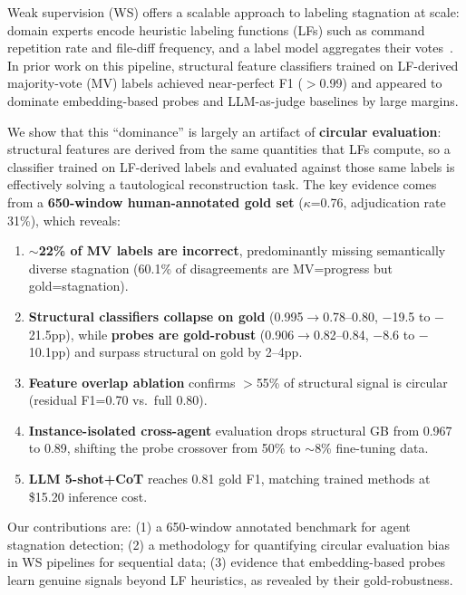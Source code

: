 \documentclass[11pt,a4paper]{article}
\begin{document}
Weak supervision (WS) offers a scalable approach to labeling stagnation at scale: domain experts encode heuristic labeling functions (LFs) such as command repetition rate and file-diff frequency, and a label model aggregates their votes~\cite{ratner2017snorkel}.
In prior work on this pipeline, structural feature classifiers trained on LF-derived majority-vote (MV) labels achieved near-perfect F1 ($>$0.99) and appeared to dominate embedding-based probes and LLM-as-judge baselines by large margins.

We show that this ``dominance'' is largely an artifact of \textbf{circular evaluation}: structural features are derived from the same quantities that LFs compute, so a classifier trained on LF-derived labels and evaluated against those same labels is effectively solving a tautological reconstruction task.
The key evidence comes from a \textbf{650-window human-annotated gold set} ($\kappa$=0.76, adjudication rate 31\%), which reveals:

\begin{enumerate}[nosep,leftmargin=*]
\item \textbf{$\sim$22\% of MV labels are incorrect}, predominantly missing semantically diverse stagnation (60.1\% of disagreements are MV=progress but gold=stagnation).
\item \textbf{Structural classifiers collapse on gold} (0.995$\to$0.78--0.80, $-$19.5 to $-$21.5pp), while \textbf{probes are gold-robust} (0.906$\to$0.82--0.84, $-$8.6 to $-$10.1pp) and surpass structural on gold by 2--4pp.
\item \textbf{Feature overlap ablation} confirms $>$55\% of structural signal is circular (residual F1=0.70 vs.\ full 0.80).
\item \textbf{Instance-isolated cross-agent} evaluation drops structural GB from 0.967 to 0.89, shifting the probe crossover from 50\% to $\sim$8\% fine-tuning data.
\item \textbf{LLM 5-shot+CoT} reaches 0.81 gold F1, matching trained methods at \$15.20 inference cost.
\end{enumerate}

Our contributions are: (1) a 650-window annotated benchmark for agent stagnation detection; (2) a methodology for quantifying circular evaluation bias in WS pipelines for sequential data; (3) evidence that embedding-based probes learn genuine signals beyond LF heuristics, as revealed by their gold-robustness.

\end{document}

